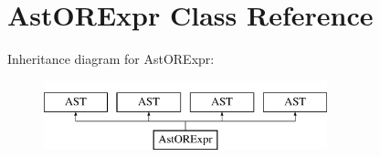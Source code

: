 \hypertarget{classAstORExpr}{\section{Ast\-O\-R\-Expr Class Reference}
\label{classAstORExpr}
}
Inheritance diagram for Ast\-O\-R\-Expr\-:\begin{figure}[H]
\begin{center}
\leavevmode
\includegraphics[height=2.000000cm]{classAstORExpr}
\end{center}
\end{figure}
